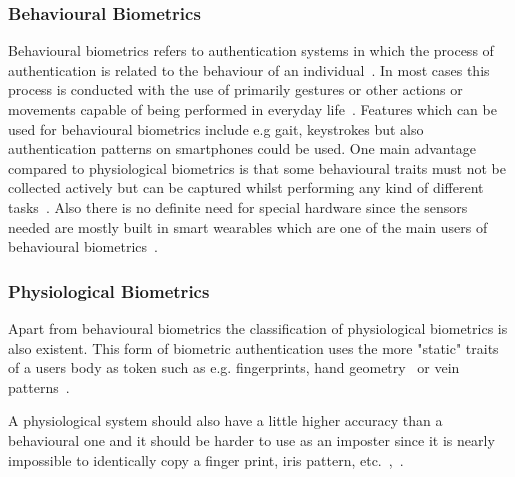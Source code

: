 \subsubsection{Behavioural Biometrics}
Behavioural biometrics refers to authentication systems in which the process of authentication is related to the behaviour of an individual~\cite{bhattacharyya2009biometric}.
In most cases this process is conducted with the use of primarily gestures or other actions or movements capable of being performed in everyday life~\cite{yampolskiy2008behavioural}.
Features which can be used for behavioural biometrics include e.g gait, keystrokes but also authentication patterns on smartphones could be used.
One main advantage compared to physiological biometrics is that some behavioural traits must not be collected actively but can be captured whilst performing any kind of different tasks~\cite{yampolskiy2008behavioural}. 
Also there is no definite need for special hardware since the sensors needed are mostly built in smart wearables which are one of the main users of behavioural biometrics~\cite{johnston2015smartwatch}.

\subsubsection{Physiological Biometrics}
Apart from behavioural biometrics the classification of physiological biometrics is also existent. 
This form of biometric authentication uses the more "static" traits of a users body as token such as e.g. fingerprints, hand geometry~\cite{alsaadi2015physiological} or vein patterns~\cite{faltaous2019vpid}.

A physiological system should also have a little higher accuracy than a behavioural one and it should be harder to use as an imposter since it is nearly impossible to identically copy a finger print, iris pattern, etc.~\cite{koong2014user},~\cite{delac2004survey}.

